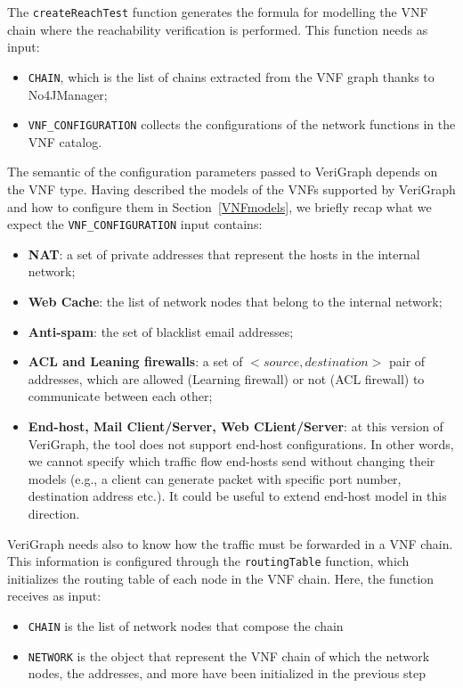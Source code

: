 The \texttt{createReachTest} function generates the formula for modelling the VNF chain where the reachability verification is performed. This function needs as input:
\begin{itemize}
	\item \texttt{CHAIN}, which is the list of chains extracted from the VNF graph thanks to No4JManager;
	\item \texttt{VNF\_CONFIGURATION} collects the configurations of the network functions in the VNF catalog.
\end{itemize}
The semantic of the configuration parameters passed to VeriGraph depends on the VNF type. Having described the models of the VNFs supported by VeriGraph and how to configure them in Section~\ref{VNFmodels}, we briefly recap what we expect the \texttt{VNF\_CONFIGURATION} input contains:
\begin{itemize}
	\item \textbf{NAT}: a set of private addresses that represent the hosts in the internal network; 
	\item \textbf{Web Cache}: the list of network nodes that belong to the internal network;
	\item \textbf{Anti-spam}: the set of blacklist email addresses;
	\item \textbf{ACL and Leaning firewalls}: a set of \textit{$<source, destination>$} pair of addresses, which are allowed (Learning firewall) or not (ACL firewall) to communicate between each other;
	\item \textbf{End-host, Mail Client/Server, Web CLient/Server}: at this version of VeriGraph, the tool does not support end-host configurations. In other words, we cannot specify which traffic flow end-hosts send without changing their models (e.g., a client can generate packet with specific port number, destination address etc.). It could be useful to extend end-host model in this direction.
\end{itemize}
 VeriGraph needs also to know how the traffic must be forwarded in a VNF chain. This information is configured through the \texttt{routingTable} function, which initializes the routing table of each node in the VNF chain. Here, the function receives as input:
 \begin{itemize}
 	\item \texttt{CHAIN} is the list of network nodes that compose the chain
 	\item \texttt{NETWORK} is the object that represent the VNF chain of which the network nodes, the addresses, and more have been initialized in the previous step 
 \end{itemize}
